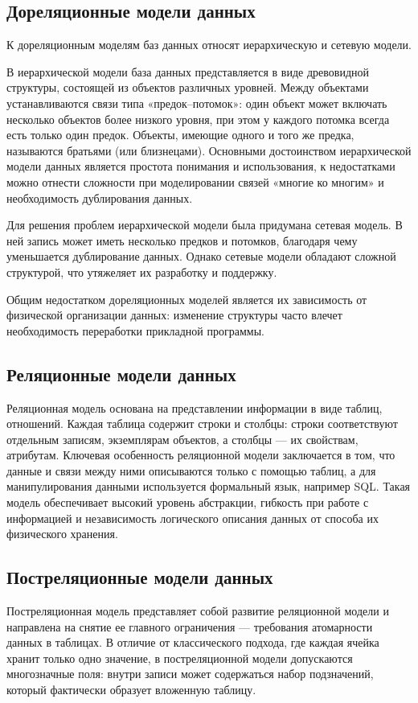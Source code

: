 \subsection{Дореляционные модели данных}
К дореляционным моделям баз данных относят иерархическую и сетевую модели.

В иерархической модели база данных представляется в виде древовидной структуры, состоящей из объектов различных уровней. Между объектами устанавливаются связи типа «предок–потомок»: один объект может включать несколько объектов более низкого уровня, при этом у каждого потомка всегда есть только один предок. Объекты, имеющие одного и того же предка, называются братьями (или близнецами). Основными достоинством иерархической модели данных является простота понимания и использования, к недостатками можно отнести сложности при моделировании связей «многие ко многим» и необходимость дублирования данных.

Для решения проблем иерархической модели была придумана сетевая модель. В ней запись может иметь несколько предков и потомков, благодаря чему уменьшается дублирование данных. Однако сетевые модели обладают сложной структурой, что утяжеляет их разработку и поддержку.

Общим недостатком дореляционных моделей является их зависимость от физической организации данных: изменение структуры часто влечет необходимость переработки прикладной программы.

\subsection{Реляционные модели данных}
Реляционная модель основана на представлении информации в виде таблиц, отношений. Каждая таблица содержит строки и столбцы: строки соответствуют отдельным записям, экземплярам объектов, а столбцы --- их свойствам, атрибутам. Ключевая особенность реляционной модели заключается в том, что данные и связи между ними описываются только с помощью таблиц, а для манипулирования данными используется формальный язык, например SQL. Такая модель обеспечивает высокий уровень абстракции, гибкость при работе с информацией и независимость логического описания данных от способа их физического хранения.

\subsection{Постреляционные модели данных}
Постреляционная модель представляет собой развитие реляционной модели и направлена на снятие ее главного ограничения --- требования атомарности данных в таблицах. В отличие от классического подхода, где каждая ячейка хранит только одно значение, в постреляционной модели допускаются многозначные поля: внутри записи может содержаться набор подзначений, который фактически образует вложенную таблицу.

